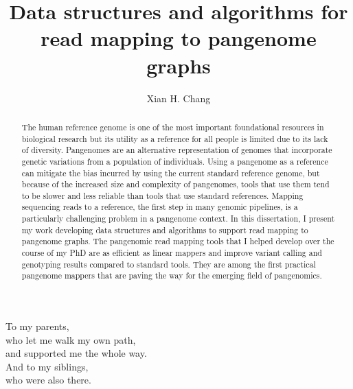\documentclass[11pt]{ucscthesis}
\begin{document}

\title{Data structures and algorithms for read mapping to pangenome graphs}
\author{Xian H. Chang}
\deanlinethree{}

\begin{frontmatter}

\maketitle
\copyrightpage

\tableofcontents
\listoffigures
\listoftables
\listofalgorithms
{}

\begin{abstract}
The human reference genome is one of the most important foundational resources in biological research but its utility as a reference for all people is limited due to its lack of diversity.
Pangenomes are an alternative representation of genomes that incorporate genetic variations from a population of individuals.
Using a pangenome as a reference can mitigate the bias incurred by using the current standard reference genome, but because of the increased size and complexity of pangenomes, tools that use them tend to be slower and less reliable than tools that use standard references.
Mapping sequencing reads to a reference, the first step in many genomic pipelines, is a particularly challenging problem in a pangenome context. 
In this dissertation, I present my work developing data structures and algorithms to support read mapping to pangenome graphs.
The pangenomic read mapping tools that I helped develop over the course of my PhD are as efficient as linear mappers and improve variant calling and genotyping results compared to standard tools.
They are among the first practical pangenome mappers that are paving the way for the emerging field of pangenomics.


\end{abstract}

\begin{dedication}
\null\vfil
{\large
\begin{center}
To my parents,\\\vspace{12pt}
who let me walk my own path,\\\vspace{12pt}
and supported me the whole way.\\\vspace{12pt}
\hfill\break
And to my siblings,\\\vspace{12pt}
who were also there.
\end{center}}
\vfil\null
\end{dedication}



\end{frontmatter}
\end{document}
